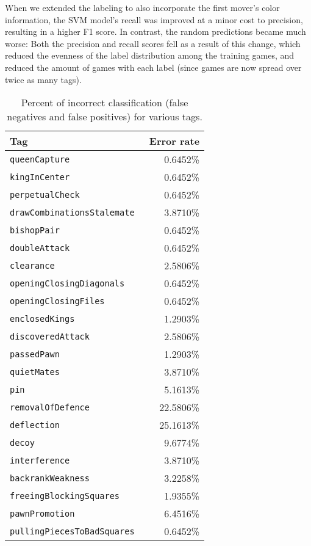 \documentclass[11pt]{article}
\begin{document}
When we extended the labeling to also incorporate the first mover's 
color information, the SVM model's recall was improved at a minor cost 
to precision, resulting in a higher F1 score. In contrast, the random 
predictions became much worse: Both the precision and recall scores fell 
as a result of this change, which reduced the evenness of the label 
distribution among the training games, and reduced the amount of games 
with each label (since games are now spread over twice as many tags).
\begin{table}
\centering
\begin{tabular}{lr}
\hline
\textbf{Tag} & \textbf{Error rate} \\ \hline
\tt{queenCapture}  & 0.6452\% \\
\tt{kingInCenter}  & 0.6452\% \\
\tt{perpetualCheck}  & 0.6452\% \\
\tt{drawCombinationsStalemate}  & 3.8710\% \\
\tt{bishopPair}  & 0.6452\% \\
\tt{doubleAttack}  & 0.6452\% \\
\tt{clearance}  & 2.5806\% \\
\tt{openingClosingDiagonals}  & 0.6452\% \\
\tt{openingClosingFiles}  & 0.6452\% \\
\tt{enclosedKings}  & 1.2903\% \\
\tt{discoveredAttack}  & 2.5806\% \\
\tt{passedPawn}  & 1.2903\% \\
\tt{quietMates}  & 3.8710\% \\
\tt{pin}  & 5.1613\% \\
\tt{removalOfDefence}  & 22.5806\% \\
\tt{deflection}  & 25.1613\% \\
\tt{decoy}  & 9.6774\% \\
\tt{interference}  & 3.8710\% \\
\tt{backrankWeakness}  & 3.2258\% \\
\tt{freeingBlockingSquares}  & 1.9355\% \\
\tt{pawnPromotion}  & 6.4516\% \\
\tt{pullingPiecesToBadSquares}  & 0.6452\% \\ \hline
\end{tabular} 
\caption{Percent of incorrect classification (false negatives and false 
positives) for various tags.}
\label{table:negatives}
\end{table}
\end{document}
